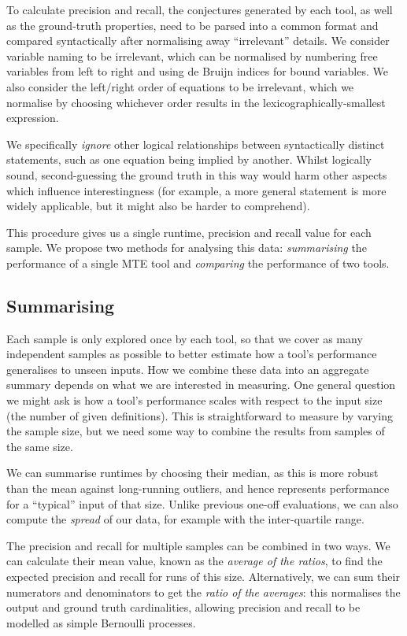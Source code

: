 To calculate precision and recall, the conjectures generated by each tool, as
well as the ground-truth properties, need to be parsed into a common format and
compared syntactically after normalising away ``irrelevant'' details. We
consider variable naming to be irrelevant, which can be normalised by numbering
free variables from left to right and using de Bruijn indices for bound
variables. We also consider the left/right order of equations to be irrelevant,
which we normalise by choosing whichever order results in the
lexicographically-smallest expression.

We specifically \emph{ignore} other logical relationships between syntactically
distinct statements, such as one equation being implied by another. Whilst
logically sound, second-guessing the ground truth in this way would harm other
aspects which influence interestingness (for example, a more general statement
is more widely applicable, but it might also be harder to comprehend).

This procedure gives us a single runtime, precision and recall value for each
sample. We propose two methods for analysing this data: \emph{summarising}
the performance of a single MTE tool and \emph{comparing} the performance of two
tools.

\subsection{Summarising}

Each sample is only explored once by each tool, so that we cover as many
independent samples as possible to better estimate how a tool's performance
generalises to unseen inputs. How we combine these data into an aggregate
summary depends on what we are interested in measuring. One general question we
might ask is how a tool's performance scales with respect to the input size (the
number of given definitions). This is straightforward to measure by varying the
sample size, but we need some way to combine the results from samples of the
same size.

We can summarise runtimes by choosing their median, as this is more robust than
the mean against long-running outliers, and hence represents performance for a
``typical'' input of that size. Unlike previous one-off evaluations, we can also
compute the \emph{spread} of our data, for example with the inter-quartile
range.

The precision and recall for multiple samples can be combined in two ways. We
can calculate their mean value, known as the \emph{average of the ratios}, to
find the expected precision and recall for runs of this size. Alternatively, we
can sum their numerators and denominators to get the \emph{ratio of the
  averages}: this normalises the output and ground truth cardinalities, allowing
precision and recall to be modelled as simple Bernoulli processes.

